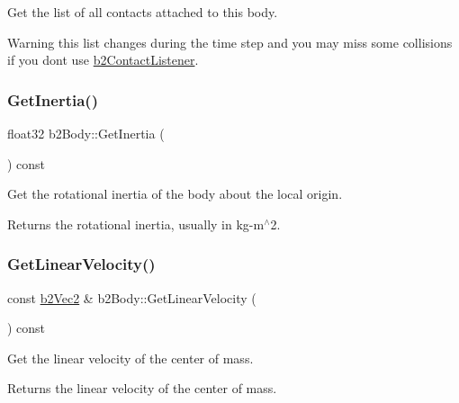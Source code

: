 Get the list of all contacts attached to this body. \begin{DoxyWarning}{Warning}
this list changes during the time step and you may miss some collisions if you don\textquotesingle{}t use \mbox{\hyperlink{classb2ContactListener}{b2\+Contact\+Listener}}. 
\end{DoxyWarning}
\mbox{\label{classb2Body_a60929c13e4b6548492dca5ec79f159db}} 
\subsubsection{\texorpdfstring{Get\+Inertia()}{GetInertia()}}
{\footnotesize\ttfamily float32 b2\+Body\+::\+Get\+Inertia (\begin{DoxyParamCaption}{ }\end{DoxyParamCaption}) const\hspace{0.3cm}{\ttfamily [inline]}}

Get the rotational inertia of the body about the local origin. \begin{DoxyReturn}{Returns}
the rotational inertia, usually in kg-\/m$^\wedge$2. 
\end{DoxyReturn}
\mbox{\label{classb2Body_a8fcaf842141320701057f679dff90b89}} 
\subsubsection{\texorpdfstring{Get\+Linear\+Velocity()}{GetLinearVelocity()}}
{\footnotesize\ttfamily const \mbox{\hyperlink{structb2Vec2}{b2\+Vec2}} \& b2\+Body\+::\+Get\+Linear\+Velocity (\begin{DoxyParamCaption}{ }\end{DoxyParamCaption}) const\hspace{0.3cm}{\ttfamily [inline]}}

Get the linear velocity of the center of mass. \begin{DoxyReturn}{Returns}
the linear velocity of the center of mass. 
\end{DoxyReturn}
\mbox{\label{classb2Body_a0ac0a4ad6ac3c7804652d9994239dcbd}} 
